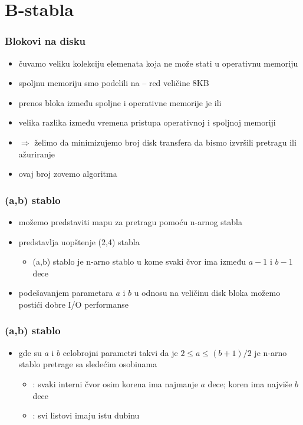 \documentclass[compress,aspectratio=169]{beamer}
\begin{document}
\section[B-stabla]{B-stabla}

\begin{frame}[fragile]
  \frametitle{Blokovi na disku}
  \begin{itemize}
    \item čuvamo veliku kolekciju elemenata koja ne može stati u 
    operativnu memoriju
    \item spoljnu memoriju smo podelili na  -- red 
      veličine 8KB
    \item prenos bloka između spoljne i operativne memorije je 
     ili 
    \item velika razlika između vremena pristupa operativnoj i spoljnoj 
    memoriji
    \item $\Rightarrow$ želimo da minimizujemo broj disk transfera da
    bismo izvršili pretragu ili ažuriranje
    \item ovaj broj zovemo  algoritma
  \end{itemize}
\end{frame}

\begin{frame}[fragile]
  \frametitle{(a,b) stablo}
  \begin{itemize}
    \item možemo predstaviti mapu za pretragu pomoću n-arnog stabla
    \item {} predstavlja uopštenje (2,4) stabla
    \begin{itemize}
      \item (a,b) stablo je n-arno stablo u kome svaki čvor ima između
      $a-1$ i $b-1$ dece
    \end{itemize}
    \item podešavanjem parametara $a$ i $b$ u odnosu na veličinu disk 
    bloka možemo postići dobre I/O performanse
  \end{itemize}
\end{frame}

\begin{frame}[fragile]
  \frametitle{(a,b) stablo}
  \begin{itemize}
    \item {} gde su $a$ i $b$ celobrojni parametri 
    takvi da je $2\leq a\leq (b+1)/2$ je n-arno stablo pretrage sa
    sledećim osobinama
    \begin{itemize}
      \item {}: svaki interni čvor osim korena ima 
      najmanje $a$ dece; koren ima najviše $b$ dece
      \item {}: svi listovi imaju istu dubinu
    \end{itemize}
  \end{itemize}
\end{frame}
\end{document}
